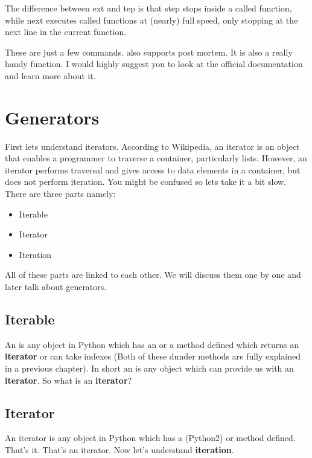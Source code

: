 \documentclass[a4paper,12pt,oneside]{sphinxmanual}
\begin{document}
The difference between ext and tep is that step stops
inside a called function, while next executes called functions at
(nearly) full speed, only stopping at the next line in the current
function.

These are just a few commands.  also supports post mortem. It is
also a really handy function. I would highly suggest you to look at the
official documentation and learn more about it.


\chapter{Generators}
\label{generators:generators}\label{generators::doc}
First lets understand iterators. According to Wikipedia, an iterator is
an object that enables a programmer to traverse a container,
particularly lists. However, an iterator performs traversal and gives
access to data elements in a container, but does not perform iteration.
You might be confused so lets take it a bit slow. There are three parts
namely:
\begin{itemize}
\item {} 
Iterable

\item {} 
Iterator

\item {} 
Iteration

\end{itemize}

All of these parts are linked to each other. We will discuss them one by
one and later talk about generators.


\section{Iterable}
\label{generators:iterable}
An  is any object in Python which has an  or a
 method defined which returns an \textbf{iterator} or can take
indexes (Both of these dunder methods are fully explained in a previous
chapter). In short an  is any object which can provide us
with an \textbf{iterator}. So what is an \textbf{iterator}?


\section{Iterator}
\label{generators:iterator}
An iterator is any object in Python which has a  (Python2) or
 method defined. That's it. That's an iterator. Now let's
understand \textbf{iteration}.
\end{document}
